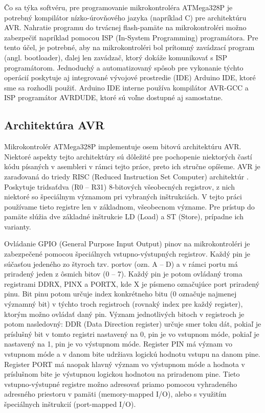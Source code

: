 Čo sa týka softvéru, pre programovanie mikrokontroléra ATMega328P je potrebný kompilátor nízko-úrovňového jazyka (napríklad C) pre architektúru AVR. Nahratie programu do trvácnej flash-pamäte na mikrokontroléri možno zabezpečiť napríklad pomocou ISP (In-System Programming) programátora. Pre tento účel, je potrebné, aby na mikrokontroléri bol prítomný zavádzací program (angl. bootloader), ďalej len zavádzač, ktorý dokáže komunikovať s ISP programátorom. Jednoduchý a automatizovaný spôsob pre vykonanie týchto operácií poskytuje aj integrované vývojové prostredie (IDE) Arduino IDE, ktoré sme sa rozhodli použiť. Arduino IDE interne používa kompilátor AVR-GCC a ISP programátor AVRDUDE, ktoré sú voľne dostupné aj samostatne.

\subsection{Architektúra AVR}
Mikrokontrolér ATMega328P implementuje osem bitovú architektúru AVR. Niektoré aspekty tejto architektúry sú dôležité pre pochopenie niektorých častí kódu písaných v asembleri v rámci tejto práce, preto ich stručne opíšeme. AVR je zaraďovaná do triedy RISC (Reduced Instruction Set Computer) architektúr \cite{avrInstruction}. Poskytuje tridsaťdva (R0 -- R31) 8-bitových všeobecných registrov, z nich niektoré so špeciálnym významom pri vybraných inštrukciách. V tejto práci používame tieto registre len v základnom, všeobecnom význame. Pre prístup do pamäte slúžia dve základné inštrukcie LD (Load) a ST (Store), prípadne ich varianty. 

Ovládanie GPIO (General Purpose Input Output) pinov na mikrokontroléri je zabezpečené pomocou špeciálnych vstupno-výstupných registrov. Každý pin je súčasťou jedeného zo štyroch tzv. portov (ozn. A -- D) a v rámci portu má priradený jeden z ôsmich bitov (0 -- 7). Každý pin je potom ovládaný troma registrami DDRX, PINX a PORTX, kde X je písmeno označujúce port priradený pinu. Bit pinu potom určuje index konkrétneho bitu (0 označuje najmenej významný bit) v týchto troch registroch (rovnaký index pre každý register), ktorým možno ovládať daný pin. Význam jednotlivých bitoch v registroch je potom nasledovný: DDR (Data Direction register) určuje smer toku dát, pokiaľ je príslušný bit v tomto registri nastavený na 0, pin je vo vstupnom móde, pokiaľ je nastavený na 1, pin je vo výstupnom móde. Register PIN má význam vo vstupnom móde a v danom bite udržiava logickú hodnotu vstupu na danom pine. Register PORT má naopak hlavný význam vo výstupnom móde a hodnota v príslušnom bite je výstupnou logickou hodnotou na priradenom pine. Tieto vstupno-výstupné registre možno adresovať priamo pomocou vyhradeného adresného priestoru v pamäti (memory-mapped I/O), alebo s využitím špeciálnych inštrukcií (port-mapped I/O).

